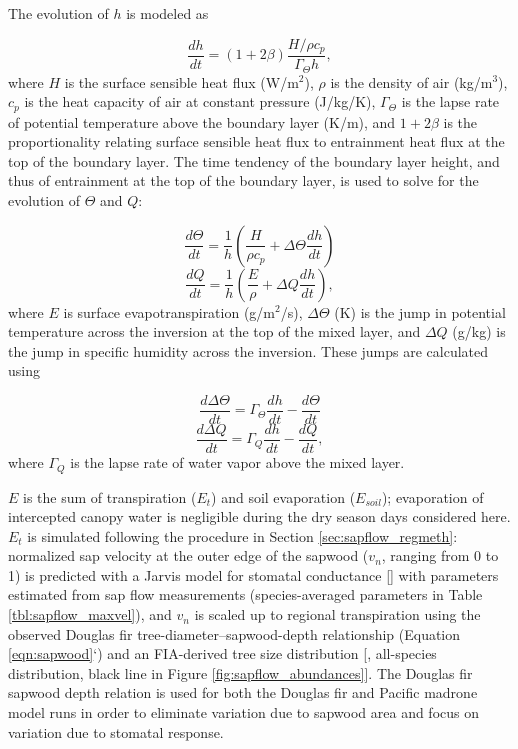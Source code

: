 The evolution of $h$ is modeled as

\begin{equation}
\frac{dh}{dt} = (1+2\beta)\frac{H/\rho c_p}{\Gamma_\Theta h},
\label{eqn:dhdt}
\end{equation}
where $H$ is the surface sensible heat flux (W/m$^2$), $\rho$ is the density of air (kg/m$^3$), $c_p$ is the heat capacity of air at constant pressure (J/kg/K), $\Gamma_\Theta$ is the lapse rate of potential temperature above the boundary layer (K/m), and $1+2\beta$ is the proportionality relating surface sensible heat flux to entrainment heat flux at the top of the boundary layer.  The time tendency of the boundary layer height, and thus of entrainment at the top of the boundary layer, is used to solve for the evolution of $\Theta$ and $Q$:

\begin{equation}
\frac{d\Theta}{dt} = \frac{1}{h}\left(\frac{H}{\rho c_p}+\Delta\Theta\frac{dh}{dt}\right)
\label{eqn:dTdt}
\end{equation}
\begin{equation}
\frac{dQ}{dt} = \frac{1}{h}\left(\frac{E}{\rho}+\Delta Q \frac{dh}{dt}\right),
\label{eqn:dQdt}
\end{equation}
where $E$ is surface evapotranspiration (g/m$^2$/s), $\Delta\Theta$ (K) is the jump in potential temperature across the inversion at the top of the mixed layer, and $\Delta Q$ (g/kg) is the jump in specific humidity across the inversion.  These jumps are calculated using

\begin{equation}
\frac{d\Delta\Theta}{dt} = \Gamma_\Theta\frac{dh}{dt}-\frac{d\Theta}{dt}
\label{eqn:dDTdt}
\end{equation}
\begin{equation}
\frac{d\Delta Q}{dt} = \Gamma_Q\frac{dh}{dt}-\frac{dQ}{dt},
\label{eqn:dDQdt}
\end{equation}
where $\Gamma_Q$ is the lapse rate of water vapor above the mixed layer.

$E$ is the sum of transpiration ($E_t$) and soil evaporation ($E_{soil}$); evaporation of intercepted canopy water is negligible during the dry season days considered here.  $E_t$ is simulated following the procedure in Section \ref{sec:sapflow_regmeth}: normalized sap velocity at the outer edge of the sapwood ($v_n$, ranging from 0 to 1) is predicted with a Jarvis model for stomatal conductance [\cite{jarvis1976interpretation}] with parameters estimated from sap flow measurements (species-averaged parameters in Table \ref{tbl:sapflow_maxvel}), and $v_n$ is scaled up to regional transpiration using the observed Douglas fir tree-diameter--sapwood-depth relationship (Equation \ref{eqn:sapwood}`) and an FIA-derived tree size distribution [\cite{woudenberg2010forest}, all-species distribution, black line in Figure \ref{fig:sapflow_abundances}].  The Douglas fir sapwood depth relation is used for both the Douglas fir and Pacific madrone model runs in order to eliminate variation due to sapwood area and focus on variation due to stomatal response.

